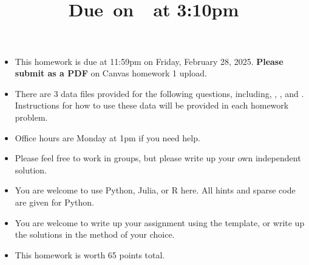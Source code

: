 \documentclass{article}
\title{
    \vspace{2in}
    \textmd{\textbf{\hmwkClass\hmwkTitle}}\\
    \normalsize\vspace{0.1in}\small{Due\ on\ \hmwkDueDate\ at 3:10pm}\\
    \vspace{3in}
}
\author{\hmwkAuthorName}
\date{}
\begin{document}

\begin{itemize}
\item This homework is due at 11:59pm on Friday, February 28, 2025. {\bf Please submit as a PDF} on Canvas homework 1 upload. 
\item There are 3 data files provided for the following questions, including, , , and . Instructions for how to use these data will be provided in each homework problem. 
\item Office hours are Monday at 1pm if you need help. 
\item Please feel free to work in groups, but please write up your own independent solution. 
\item You are welcome to use Python, Julia, or R here. All hints and sparse code are given for Python.
\item You are welcome to write up your assignment using the  template, or write up the solutions in the method of your choice. 
\item This homework is worth 65 points total. 
\end{itemize}
\end{document}

